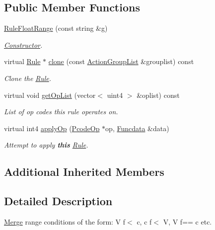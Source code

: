 \subsection*{Public Member Functions}
\begin{DoxyCompactItemize}
\item 
\mbox{\hyperlink{class_rule_float_range_aa69970a8fae3c4a77dca595f4b14765c}{Rule\+Float\+Range}} (const string \&g)
\begin{DoxyCompactList}\small\item\em \mbox{\hyperlink{class_constructor}{Constructor}}. \end{DoxyCompactList}\item 
virtual \mbox{\hyperlink{class_rule}{Rule}} $\ast$ \mbox{\hyperlink{class_rule_float_range_a31ef31a3d85c60fbf0a3e64e48e2f0bd}{clone}} (const \mbox{\hyperlink{class_action_group_list}{Action\+Group\+List}} \&grouplist) const
\begin{DoxyCompactList}\small\item\em Clone the \mbox{\hyperlink{class_rule}{Rule}}. \end{DoxyCompactList}\item 
virtual void \mbox{\hyperlink{class_rule_float_range_a7eadff5b3fdebe17ca72c9ec23cb0484}{get\+Op\+List}} (vector$<$ uint4 $>$ \&oplist) const
\begin{DoxyCompactList}\small\item\em List of op codes this rule operates on. \end{DoxyCompactList}\item 
virtual int4 \mbox{\hyperlink{class_rule_float_range_a39c5067872e30f4d32dc229c53504cef}{apply\+Op}} (\mbox{\hyperlink{class_pcode_op}{Pcode\+Op}} $\ast$op, \mbox{\hyperlink{class_funcdata}{Funcdata}} \&data)
\begin{DoxyCompactList}\small\item\em Attempt to apply {\bfseries{this}} \mbox{\hyperlink{class_rule}{Rule}}. \end{DoxyCompactList}\end{DoxyCompactItemize}
\subsection*{Additional Inherited Members}


\subsection{Detailed Description}
\mbox{\hyperlink{class_merge}{Merge}} range conditions of the form\+: {\ttfamily V f$<$ c, c f$<$ V, V f== c} etc. 


